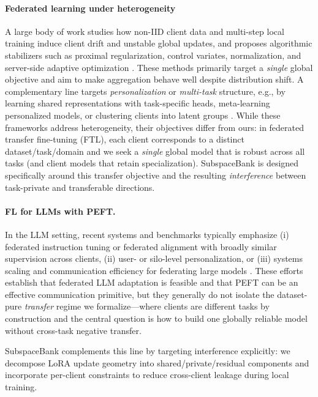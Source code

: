 \documentclass{article}
\theoremstyle{plain}
\theoremstyle{definition}
\theoremstyle{remark}
\begin{document}
\paragraph{Federated learning under heterogeneity}
A large body of work studies how non-IID client data and multi-step local training induce client drift and unstable global updates, and proposes algorithmic stabilizers such as proximal regularization, control variates, normalization, and server-side adaptive optimization
\citet{karimireddy2020scaffold,wang2020fednova,reddi2021adaptive,acar2021feddyn}.
These methods primarily target a \emph{single} global objective and aim to make aggregation behave well despite distribution shift. A complementary line targets \emph{personalization} or \emph{multi-task} structure, e.g., by learning shared representations with task-specific heads, meta-learning personalized models, or clustering clients into latent groups
\citet{smith2017mocha,dinh2020pfedme,li2021ditto,collins2021fedrep,ghosh2020ifca,sattler2020clustered}.
While these frameworks address heterogeneity, their objectives differ from ours: in federated transfer fine-tuning (FTL), each client corresponds to a distinct dataset/task/domain and we seek a \emph{single} global model that is robust across all tasks (and client models that retain specialization). SubspaceBank is designed specifically around this transfer objective and the resulting \emph{interference} between task-private and transferable directions.

\paragraph{FL for LLMs with PEFT.}
In the LLM setting, recent systems and benchmarks typically emphasize (i) federated instruction tuning or federated alignment with broadly similar supervision across clients, (ii) user- or silo-level personalization, or (iii) systems scaling and communication efficiency for federating large models
\citet{ye2024openfedllm,liu2024ferret,zhao2022fedprompt,guo2023promptfl,hu2022lora}.
These efforts establish that federated LLM adaptation is feasible and that PEFT can be an effective communication primitive, but they generally do not isolate the dataset-pure \emph{transfer} regime we formalize—where clients are different tasks by construction and the central question is how to build one globally reliable model without cross-task negative transfer. 

SubspaceBank complements this line by targeting interference explicitly: we decompose LoRA update geometry into shared/private/residual components and incorporate per-client constraints to reduce cross-client leakage during local training.
\end{document}
